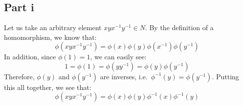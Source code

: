 \documentclass[letterpaper]{article}
\begin{document}
\section{}
\label{sec:Question8}

\subsection{Part i}
\label{subs:8Parti}

Let us take an arbitrary element $ xyx^{-1}y^{-1} \in N $.
By the definition of a homomorphism, we know that:
\[
\phi \left(xyx^{-1}y^{-1} \right) = \phi(x) \phi(y) \phi(x^{-1}) \phi(y^{-1})
\]
In addition, since $ \phi(1) = 1 $, we can easily see:
\[
1 = \phi(1) = \phi \left(y y^{-1} \right) = \phi(y)\phi(y^{-1})
\]
Therefore, $ \phi(y) $ and $ \phi(y^{-1}) $ are inverses, i.e.\ $ \phi^{-1}(y) = \phi(y^{-1}) $.
Putting this all together, we see that:
\begin{equation}
    \label{eqn:homo-commutator-forward-long}
\phi \left(xyx^{-1}y^{-1} \right) = \phi(x) \phi(y) \phi^{-1}(x) \phi^{-1}(y)
\end{equation}
\end{document}
